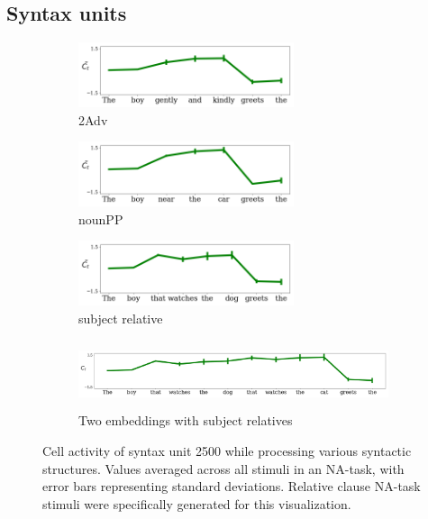 \subsection{Syntax units}
\label{sec:syntax-units}

\begin{figure}[t]
    \begin{subfigure}{0.32\textwidth}
            \centering
            \includegraphics[width=\linewidth, height=1.9cm]{Figures/adv_conjunction_1149_cell}
            \caption{2Adv}
            \label{fig:syntax-unit-2Adv}
    \end{subfigure}
    \begin{subfigure}{0.32\textwidth}
            \centering
            \includegraphics[width=\linewidth, height=1.9cm]{Figures/nounpp_1149_cell.png}
            \caption{nounPP}
            \label{fig:syntax-unit-nounpp}
    \end{subfigure}
    \begin{subfigure}{0.32\textwidth}
            \centering
            \includegraphics[width=\linewidth, height=1.9cm]{Figures/subjrel_that_1149_cell.png}
            \caption{subject relative}
            \label{fig:syntax-unit-subjrel}
    \end{subfigure}
    \begin{subfigure}{\textwidth}
            \centering
            \includegraphics[width=\linewidth, height=2cm]{Figures/double_subjrel_that_1149_cell.png}
            \caption{Two embeddings with subject relatives}
            \label{fig:syntax-unit-double-subjrel}
    \end{subfigure}
\caption{Cell activity of syntax unit \unit{2}{500} while processing various syntactic structures. Values averaged across all stimuli in an NA-task, with error bars representing standard deviations. Relative clause NA-task stimuli were specifically generated for this visualization.}
\end{figure}

